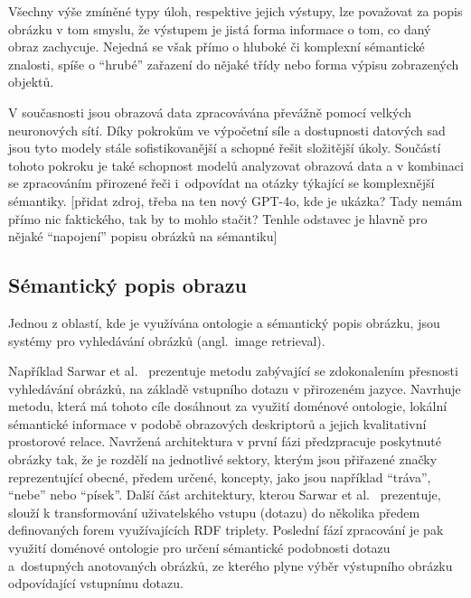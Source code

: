 Všechny výše zmíněné typy úloh, respektive jejich výstupy, lze považovat za popis obrázku v tom smyslu,
že výstupem je jistá forma informace o tom, co daný obraz zachycuje.
Nejedná se však přímo o hluboké či komplexní sémantické znalosti, spíše o \enquote{hrubé} zařazení do nějaké třídy nebo forma výpisu zobrazených objektů.

V současnosti jsou obrazová data zpracovávána převážně pomocí velkých neuronových sítí.
Díky pokrokům ve výpočetní síle a dostupnosti datových sad jsou tyto modely stále sofistikovanější a schopné řešit složitější úkoly.
Součástí tohoto pokroku je také schopnost modelů analyzovat obrazová data a v kombinaci se zpracováním přirozené řeči i~odpovídat na otázky týkající se komplexnější sémantiky.
{\footnotesize\color{red} [přidat zdroj, třeba na ten nový GPT-4o, kde je ukázka? Tady nemám přímo nic faktického, tak by to mohlo stačit? Tenhle odstavec je hlavně pro nějaké \enquote{napojení} popisu obrázků na sémantiku]}

\newpage
\subsection{Sémantický popis obrazu}
Jednou z oblastí, kde je využívána ontologie a sémantický popis obrázku, jsou systémy pro vyhledávání obrázků (angl.~image retrieval).

Například Sarwar et al.~\cite{SARWAR2013285} prezentuje metodu zabývající se zdokonalením přesnosti vyhledávání obrázků,
na základě vstupního dotazu v přirozeném jazyce.
Navrhuje metodu, která má tohoto cíle dosáhnout za využití doménové ontologie, lokální sémantické informace v podobě
obrazových deskriptorů a jejich kvalitativní prostorové relace.
Navržená architektura v první fázi předzpracuje poskytnuté obrázky tak, že je rozdělí na jednotlivé sektory, kterým jsou
přiřazené značky reprezentující obecné, předem určené, koncepty, jako jsou například \enquote{tráva}, \enquote{nebe} nebo \enquote{písek}.
Další část architektury, kterou Sarwar et al.~\cite{SARWAR2013285} prezentuje, slouží k transformování uživatelského vstupu (dotazu)
do několika předem definovaných forem využívajících RDF triplety.
Poslední fází zpracování je pak využití doménové ontologie pro určení sémantické podobnosti dotazu a~dostupných anotovaných obrázků,
ze kterého plyne výběr výstupního obrázku odpovídající vstupnímu dotazu.

